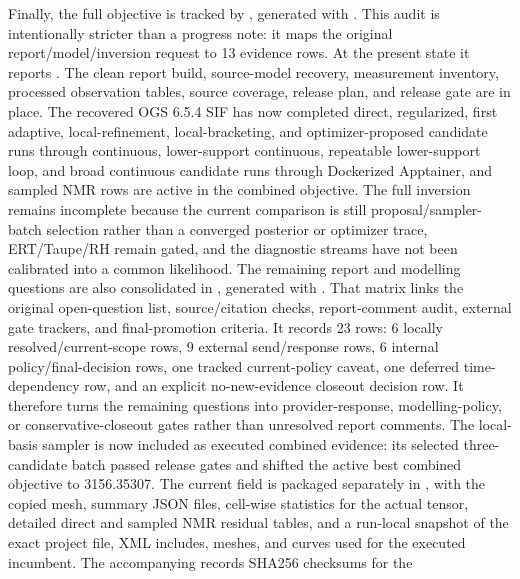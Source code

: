 Finally, the full objective is tracked by
, generated with
.  This audit is intentionally stricter than
a progress note: it maps the original report/model/inversion request to 13 evidence
rows.  At the present state it reports .  The
clean report build, source-model recovery, measurement inventory, processed
observation tables, source coverage, release plan, and release gate are in place.
The recovered OGS 6.5.4 SIF has now completed direct, regularized, first adaptive,
local-refinement, local-bracketing, and optimizer-proposed candidate runs through
continuous, lower-support continuous, repeatable lower-support loop, and broad
continuous candidate runs
through Dockerized Apptainer, and sampled NMR rows are active in the combined
objective.  The full inversion remains
incomplete because the current comparison is still proposal/sampler-batch selection
rather than a converged posterior or optimizer trace, ERT/Taupe/RH remain gated, and
the diagnostic streams have not been calibrated into a common likelihood.
The remaining report and modelling questions are also consolidated in
, generated with
.  That matrix links the original
open-question list, source/citation checks, report-comment audit, external gate
trackers, and final-promotion criteria.  It records 23 rows: 6 locally
resolved/current-scope rows, 9 external send/response rows, 6 internal
policy/final-decision rows, one tracked current-policy caveat, one deferred
time-dependency row, and an explicit no-new-evidence closeout decision row.  It
therefore turns the remaining questions into provider-response, modelling-policy,
or conservative-closeout gates rather than unresolved report comments.
The local-basis sampler is now included as executed combined evidence: its selected
three-candidate batch passed release gates and shifted the active best combined
objective to 3156.35307.
The current field is packaged separately in
,
with the copied  mesh, summary JSON files,
cell-wise statistics for the actual  tensor, detailed direct and sampled
NMR residual tables, and a run-local  snapshot of the exact
project file, XML includes, meshes, and curves used for the executed incumbent.  The
accompanying  records SHA256 checksums for the
